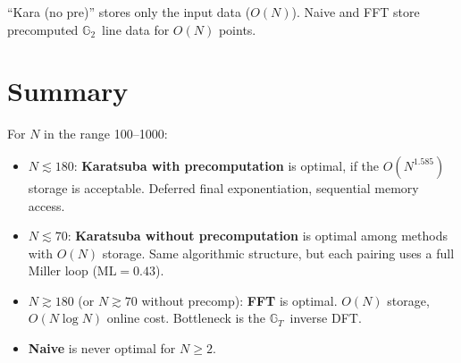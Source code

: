 \documentclass[11pt]{article}
\newcommand{\Gt}{\mathbb{G}_T}
\newcommand{\Gtwo}{\mathbb{G}_2}
\theoremstyle{plain}
\theoremstyle{remark}
\begin{document}
\noindent
``Kara (no pre)'' stores only the input data ($O(N)$).
Naive and FFT store precomputed $\Gtwo$~line data
for $O(N)$ points.

\section{Summary}

For $N$ in the range 100--1000:
\begin{itemize}
\item $N \lesssim 180$:
\textbf{Karatsuba with precomputation} is optimal,
if the $O(N^{1.585})$ storage is acceptable.
Deferred final exponentiation,
sequential memory access.

\item $N \lesssim 70$:
\textbf{Karatsuba without precomputation} is optimal
among methods with $O(N)$ storage.
Same algorithmic structure,
but each pairing uses a full Miller loop ($\mathrm{ML} = 0.43$).

\item $N \gtrsim 180$ (or $N \gtrsim 70$ without precomp):
\textbf{FFT} is optimal.
$O(N)$ storage, $O(N \log N)$ online cost.
Bottleneck is the $\Gt$~inverse DFT.

\item \textbf{Naive} is never optimal for $N \ge 2$.
\end{itemize}
\end{document}

